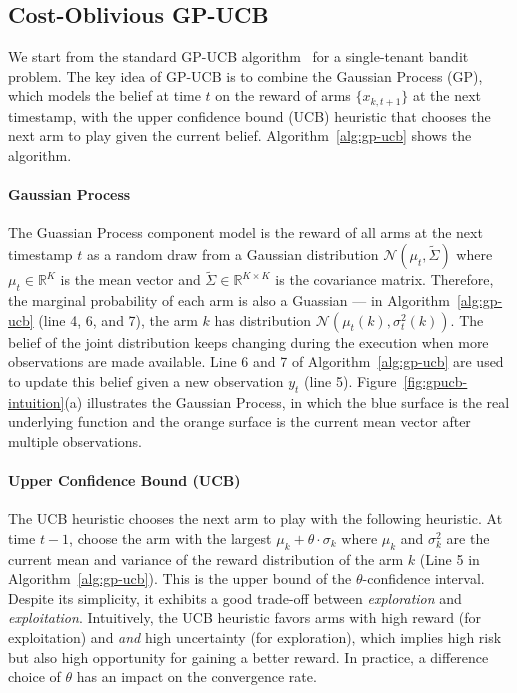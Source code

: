 \documentclass[letterpaper]{vldb}
\begin{document}
\vspace{-1em}
\subsection{Cost-Oblivious GP-UCB}

We start from the standard GP-UCB algorithm~\cite{DBLP:journals/ftml/BubeckC12} for a single-tenant bandit problem.
The key idea of GP-UCB is to combine the Gaussian Process (GP),
which models the belief at time $t$ on the reward of arms $\{x_{k,{t+1}}\}$
at the next timestamp, with the upper confidence bound (UCB) 
heuristic that chooses the next arm to play given the current belief.
Algorithm~\ref{alg:gp-ucb} shows the algorithm.


\vspace{-0.75em}
\paragraph*{Gaussian Process} The Guassian Process component model is
the reward of all arms at the next timestamp $t$ as a random draw from a 
Gaussian distribution
$\mathcal{N}(\mu_t, \tilde{\Sigma})$ where $\mu_t \in \mathbb{R}^K$ is the
mean vector and $\tilde{\Sigma} \in \mathbb{R}^{K \times K}$ is the covariance
matrix. Therefore, the marginal probability of each arm is also a Guassian ---
in Algorithm~\ref{alg:gp-ucb} (line 4, 6, and 7), the arm $k$ has distribution
$\mathcal{N}(\mu_t(k), \sigma_t^2(k))$. The belief of the joint distribution
keeps changing during the execution when more observations are made
available. Line 6 and 7 of Algorithm~\ref{alg:gp-ucb} are used to
update this belief given a new observation $y_t$ (line 5).
Figure~\ref{fig:gpucb-intuition}(a) illustrates the Gaussian Process, in which
the blue surface is the real underlying function and the orange
surface is the current mean vector after multiple observations.


\vspace{-0.75em}
\paragraph*{Upper Confidence Bound (UCB)} The UCB heuristic
chooses the next arm to play with the following heuristic. At time $t-1$,
choose the arm with the largest $\mu_k + \theta\cdot\sigma_k$ where 
$\mu_k$ and $\sigma_k^2$ are the current mean and variance of the 
reward distribution of the arm $k$ (Line 5 in Algorithm~\ref{alg:gp-ucb}). 
This is the upper bound of the $\theta$-confidence interval.
Despite its simplicity, it exhibits a good trade-off between \emph{exploration} and \emph{exploitation}.
Intuitively, the UCB heuristic favors arms with high reward (for exploitation) and \emph{and} high uncertainty (for exploration), which implies high risk but also high opportunity for gaining a better reward.
In practice, a difference choice of $\theta$ has an impact on the convergence rate.
\end{document}
